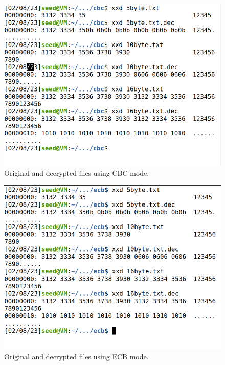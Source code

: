 \begin{figure}
    \centering
    \includegraphics[height=\textheight,width=\textwidth,keepaspectratio]
    {figures/padding_cbc.png}
    \caption{Original and decrypted files using CBC mode.}\label{fig:padding_cbc}
\end{figure}

\begin{figure}
    \centering
    \includegraphics[height=\textheight,width=\textwidth,keepaspectratio]
    {figures/padding_ecb.png}
    \caption{Original and decrypted files using ECB mode.}\label{fig:padding_ecb}
\end{figure}

